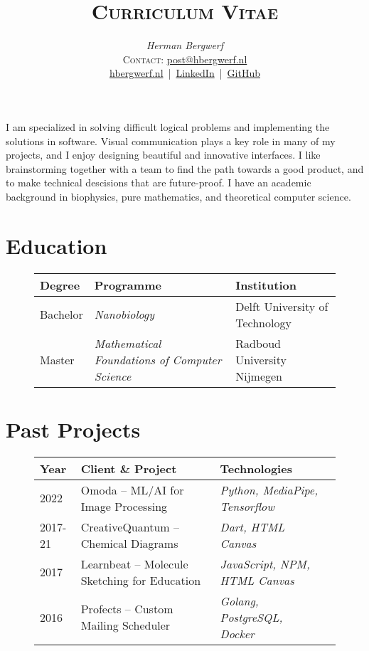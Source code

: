 \documentclass[a4paper,12pt]{article}
\date{}
\title{\textsc{Curriculum Vitae}}
\author{\emph{Herman Bergwerf}\\%
{\small \textsc{Contact:} \href{mailto:post@hbergwerf.nl}{post@hbergwerf.nl}}\\%
{\small
\href{https://www.hbergwerf.nl}{hbergwerf.nl}~|~\href{https://www.linkedin.com/in/hbergwerf/}{LinkedIn}~|~\href{https://github.com/bergwerf}{GitHub}
}}
\begin{document}
\maketitle
\noindent
I am specialized in solving difficult logical problems and implementing the solutions in software. Visual communication plays a key role in many of my projects, and I enjoy designing beautiful and innovative interfaces. I like brainstorming together with a team to find the path towards a good product, and to make technical descisions that are future-proof. I have an academic background in biophysics, pure mathematics, and theoretical computer science.

\section*{Education}

\begin{figure}[h]
\centering
\begin{tabular}{lll}
\toprule
{\bf Degree} & {\bf Programme} & {\bf Institution}\\
\midrule
Bachelor & \emph{Nanobiology} & Delft University of Technology\\
Master & \emph{Mathematical Foundations of Computer Science} & Radboud University Nijmegen\\
\bottomrule
\end{tabular}
\end{figure}

\section*{Past Projects}

\begin{figure}[h]
\centering
\begin{tabular}{llll}
\toprule
{\bfseries Year} & {\bfseries Client \& Project} & {\bfseries Technologies}\\
\midrule
2022 & Omoda -- ML/AI for Image Processing & \emph{Python, MediaPipe, Tensorflow}\\
2017-21 & CreativeQuantum -- Chemical Diagrams & \emph{Dart, HTML Canvas}\\
2017 & Learnbeat -- Molecule Sketching for Education & \emph{JavaScript, NPM, HTML Canvas}\\
2016 & Profects -- Custom Mailing Scheduler & \emph{Golang, PostgreSQL, Docker}\\
\bottomrule
\end{tabular}
\end{figure}
\end{document}
